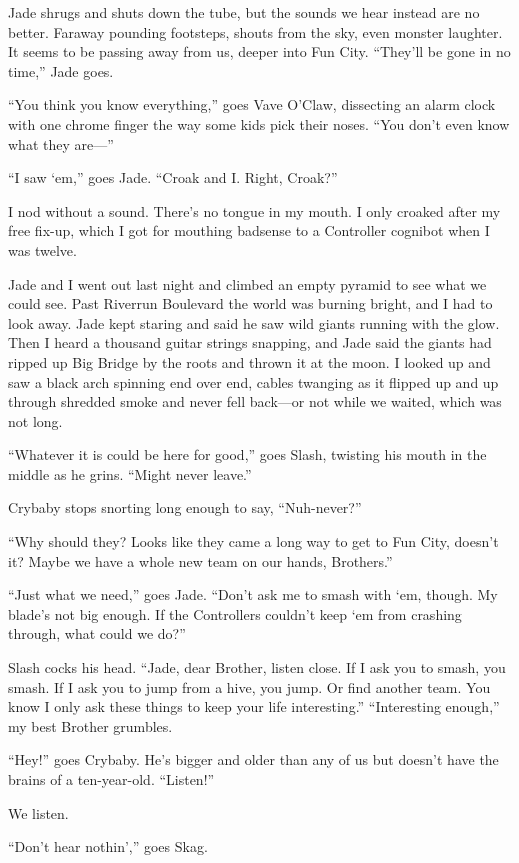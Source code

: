 Jade shrugs and shuts down the tube, but the sounds we hear instead are no better. Faraway pounding footsteps, shouts from the sky, even monster laughter. It seems to be passing away from us, deeper into Fun City.
“They'll be gone in no time,” Jade goes.

“You think you know everything,” goes Vave O'Claw, dissecting an alarm clock with one chrome finger the way some kids pick their noses. “You don't even know what they are—”

“I saw ‘em,” goes Jade. “Croak and I. Right, Croak?”

I nod without a sound. There's no tongue in my mouth. I only croaked after my free fix-up, which I got for mouthing badsense to a Controller cognibot when I was twelve.

Jade and I went out last night and climbed an empty pyramid to see what we could see. Past Riverrun Boulevard the world was burning bright, and I had to look away. Jade kept staring and said he saw wild giants running with the glow. Then I heard a thousand guitar strings snapping, and Jade said the giants had ripped up Big Bridge by the roots and thrown it at the moon. I looked up and saw a black arch spinning end over end, cables twanging as it flipped up and up through shredded smoke and never fell back—or not while we waited, which was not long.

“Whatever it is could be here for good,” goes Slash, twisting his mouth in the middle as he grins. “Might never leave.”

Crybaby stops snorting long enough to say, “Nuh-never?”

“Why should they? Looks like they came a long way to get to Fun City, doesn't it? Maybe we have a whole new team on our hands, Brothers.”

“Just what we need,” goes Jade. “Don't ask me to smash with ‘em, though. My blade's not big enough. If the Controllers couldn't keep ‘em from crashing through, what could we do?”

Slash cocks his head. “Jade, dear Brother, listen close. If I ask you to smash, you smash. If I ask you to jump from a hive, you jump. Or find another team. You know I only ask these things to keep your life interesting.”
“Interesting enough,” my best Brother grumbles.

“Hey!” goes Crybaby. He's bigger and older than any of us but doesn't have the brains of a ten-year-old. “Listen!”

We listen.

“Don't hear nothin',” goes Skag.

